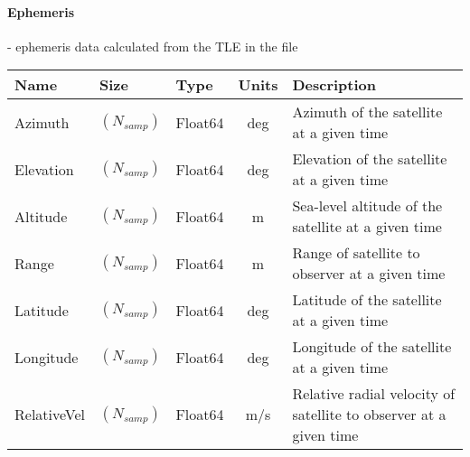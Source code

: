 \documentclass[12pt]{article}
\begin{document}
\begin{small}
\paragraph{Ephemeris}- ephemeris data calculated from the TLE in the file\\
\begin{scriptsize}
\begin{tabular}{|l|l|l|c|p{7cm}|}
\hline
\textbf{Name} & \textbf{Size} & \textbf{Type} & \textbf{Units} & \textbf{Description} \\
\hline

Azimuth & $(N_{samp})$ & Float64 & deg & Azimuth of the satellite at a given time\\
Elevation & $(N_{samp})$ & Float64 & deg & Elevation of the satellite at a given time\\
Altitude & $(N_{samp})$ & Float64 & m & Sea-level altitude of the satellite at a given time\\
Range & $(N_{samp})$ & Float64 & m & Range of satellite to observer at a given time\\
Latitude & $(N_{samp})$ & Float64 & deg & Latitude of the satellite at a given time\\
Longitude & $(N_{samp})$ & Float64 & deg & Longitude of the satellite at a given time\\
RelativeVel & $(N_{samp})$ & Float64 & m/s & Relative radial velocity of satellite to observer at a given time\\
\hline
\end{tabular}
\end{scriptsize}


\end{small}
\end{document}
